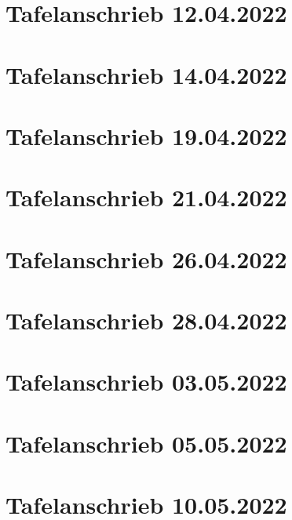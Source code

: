 \documentclass[a4paper,12pt]{article}
\begin{document}
\tableofcontents
\newpage
\section{Tafelanschrieb 12.04.2022}

\newpage
\section{Tafelanschrieb 14.04.2022}

\section{Tafelanschrieb 19.04.2022}

\section{Tafelanschrieb 21.04.2022}

\newpage
\section{Tafelanschrieb 26.04.2022}

\newpage
\section{Tafelanschrieb 28.04.2022}

\newpage
\section{Tafelanschrieb 03.05.2022}

\newpage
\section{Tafelanschrieb 05.05.2022}

\newpage
\section{Tafelanschrieb 10.05.2022}

\end{document}
